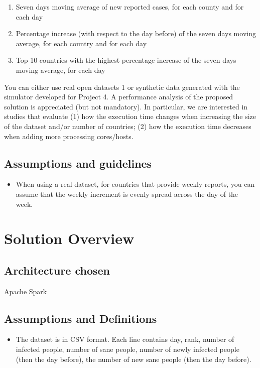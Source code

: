 \documentclass[table, 12pt]{article}
\begin{document}
\begin{enumerate}


\item Seven days moving average of new reported cases, for each county and for each day
\item Percentage increase (with respect to the day before) of the seven days moving average, for each country
and for each day
\item Top 10 countries with the highest percentage increase of the seven days moving average, for each day
\end{enumerate}
You can either use real open datasets 1 or synthetic data generated with the simulator developed for Project 4.
A performance analysis of the proposed solution is appreciated (but not mandatory). In particular, we are
interested in studies that evaluate (1) how the execution time changes when increasing the size of the dataset
and/or number of countries; (2) how the execution time decreases when adding more processing cores/hosts.

\subsection{Assumptions and guidelines}
 \begin{itemize}
 

 
 \item
When using a real dataset, for countries that provide weekly reports, you can assume that the weekly increment is evenly spread across the day of the week.

 \end{itemize}



\section{Solution Overview}
\subsection{Architecture chosen}
Apache Spark



\subsection{Assumptions and Definitions}
\begin{itemize}


\setlength\itemsep{-0.5em}
	\item The dataset is in CSV format. Each line contains day, rank, number of infected people, number of sane people, number of newly infected people (then the day before), the number of new sane people (then the day before).
\end{itemize}
\end{document}
